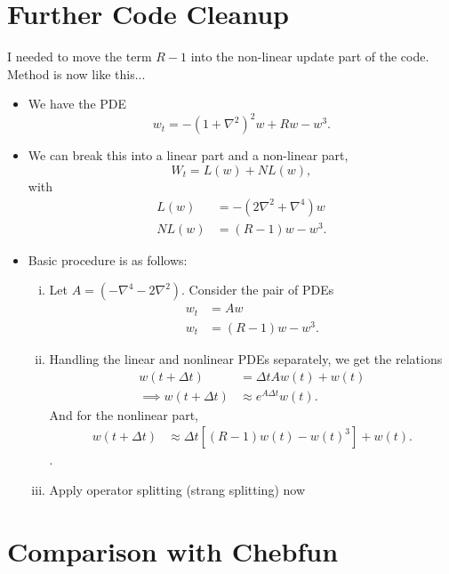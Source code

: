 \documentclass[12pt]{article}
\begin{document}
\section{Further Code Cleanup}
I needed to move the term $R-1$ into the non-linear update part of the code. Method is now like this...
\begin{itemize}
        \item We have the PDE
        \[
            w_t = -(1+\nabla^2)^2w + Rw - w^3.
        \] 
    \item
        We can break this into a linear part and a non-linear part,
        \[
            W_t = L(w) + NL(w),
        \] 
        with
        \begin{align*}
            L(w) &= -(2\nabla^2+\nabla^4)w\\
            NL(w) &=  (R-1)w- w^3.
        \end{align*}
         \item 
        Basic procedure is as follows:
        \begin{enumerate}[(i)]
            \item Let $A = (-\nabla^4-2\nabla^2)$. Consider the pair of PDEs
                \begin{align*}
                    w_t &= Aw\\
                    w_t &= (R-1)w-w^3.
                \end{align*}
            \item
                Handling the linear and nonlinear PDEs separately, we get the relations
                \begin{align*}
                    w(t+\Delta t) &= \Delta t Aw(t)+w(t)\\
                    \implies w(t+\Delta t) &\approx e^{A\Delta t}w(t).
                \end{align*}
                And for the nonlinear part,
                \begin{align*}
                    w(t+\Delta t) &\approx \Delta t \left[(R-1)w(t)-w(t)^3\right]+w(t).
                \end{align*}.
            \item Apply operator splitting (strang splitting) now
            \end{enumerate}
    \end{itemize}
\section{Comparison with Chebfun}
\end{document}
